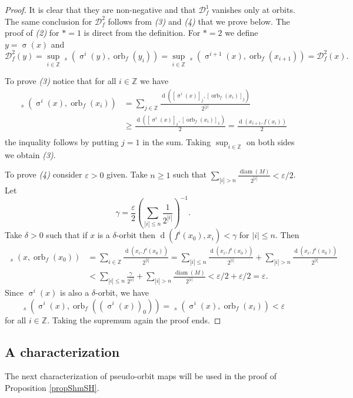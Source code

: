 \documentclass[12pt]{amsart}
\DeclareMathOperator{\shift}{\sigma}
\theoremstyle{plain}
\theoremstyle{definition}
\theoremstyle{remark}
\DeclareMathOperator{\diam}{diam}
\DeclareMathOperator{\dist}{d}
\DeclareMathOperator{\tdist}{\tilde{d}}
\DeclareMathOperator{\orb}{orb}
\newcommand{\Z}{\mathbb Z}
\renewcommand{\epsilon}{\varepsilon}
\begin{document}
\begin{proof}
	It is clear that they are non-negative and that $\mathcal{D}^1_f$ vanishes only at orbits. The same conclusion for $\mathcal{D}^2_f$ follows from \textit{(3)} and \textit{(4)} that we prove below.
	The proof of \textit{(2)} for $*=1$ is direct from the definition. For $*=2$ we define $y=\shift(x)$ and
	\[
	\mathcal{D}^2_f(y)=
	\sup_{i\in\Z}\tdist_s(\shift^i(y),\orb_f(y_i))
	=
	\sup_{i\in\Z}\tdist_s(\shift^{i+1}(x),\orb_f(x_{i+1}))
	=
	\mathcal{D}^2_f(x).
	\]


	To prove \textit{(3)} notice that for all $i\in\Z$ we have
	\begin{align*}
		\tdist_s(\shift^i(x),\orb_f(x_i))
		&=\sum_{j\in\Z}\frac{\dist([\shift^i(x)]_j,[\orb_f(x_i)]_j)}{2^{|j|}}\\
		&{\geq}\frac{\dist([\shift^i(x)]_1,[\orb_f(x_i)]_1)}{2} =\frac{\dist(x_{i+1},f(x_i))}{2}\\
	\end{align*}
	the inquality follows by putting $j=1$ in the sum.
	Taking $\sup_{i\in\Z}$ on both sides we obtain \textit{(3)}.

	To prove \textit{(4)} consider $\epsilon>0$ given.
	Take $n\geq 1$ such that
	$\sum_{|i|>n}\frac{\diam(M)}{2^{|i|}}<\epsilon/2$.
	Let $$\gamma=\frac{\epsilon}{2}\left(\sum_{|i|\leq n} \frac{1}{2^{|i|}}\right)^{-1}.$$
	Take $\delta>0$	such that if $x$ is a $\delta$-orbit then $\dist(f^i(x_0),x_i)<\gamma$ for $|i|\leq n$.
	Then
	\begin{align*}
		\tdist_s(x,\orb_f(x_0))&=
		\sum_{i\in\Z}\frac{\dist(x_i,f^i(x_0))}{2^{|i|}}
		=\sum_{|i|\leq n}\frac{\dist(x_i,f^i(x_0))}{2^{|i|}}+
		\sum_{|i|>n}\frac{\dist(x_i,f^i(x_0))}{2^{|i|}} \\
		&<\sum_{|i|\leq n}\frac{\gamma}{2^{|i|}}+
		\sum_{|i|>n}\frac{\diam(M)}{2^{|i|}}
		<\epsilon/2+\epsilon/2=\epsilon.
	\end{align*}
	Since $\shift^i(x)$ is also a $\delta$-orbit, we have
	\[
	\tdist_s(\shift^i(x),\orb_f((\shift^i(x))_0))=
	\tdist_s(\shift^i(x),\orb_f(x_i))<\epsilon
	\]
	for all $i\in\Z$. Taking the supremum again the proof ends.
\end{proof}

\subsection{A characterization}
\label{secCharPom}
The next characterization of pseudo-orbit maps will be used in the proof of Proposition \ref{propShmSH}.
\end{document}
